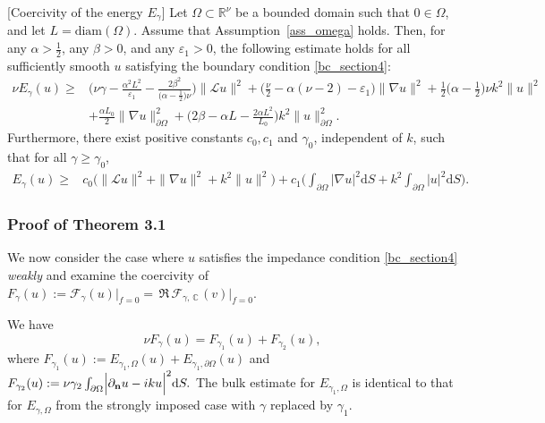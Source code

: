 \documentclass[twoside,11pt]{article}
\def\dimx{\nu }
\def\d{{\mathrm d}}
\def\C{{\mathbb C}}
\def\L{{\mathscr{L}}}
\def\L{{\mathscr{L}}}
\begin{document}
{\begin{theorem}\label{Th_coerc_gamma}{[Coercivity of the energy $E_{\gamma}$]}
Let $\Omega \subset \mathbb{R}^{{\dimx}}$ be a bounded domain such that $0 \in \Omega$, and let $L=\mathrm{diam}(\Omega)$. Assume that Assumption~\ref{ass_omega} holds. Then, for any $\alpha>\tfrac12$, any $\beta>0$, and any $\varepsilon_1>0$, the following estimate holds for all sufficiently smooth $u$ satisfying the boundary condition \eqref{bc_section4}:
\begin{equation}
\label{coerc_1}
\begin{split}
{\dimx} E_{\gamma}(u) 
 \ge  & 
\Bigg({\dimx} \gamma  -  \frac{\alpha^2 L^2}{\varepsilon_1}  -  \frac{2 \beta^2}{{\big(\alpha-\tfrac12\big) \dimx}} \Bigg)  \|\L u\|^2
 +  \Big(\tfrac{{\dimx}}{2} - \alpha({\dimx}-2) - \varepsilon_1\Big) \|\nabla u\|^2
 +  \tfrac12 \big(\alpha-\tfrac12\big) {\dimx} k^2 \|u\|^2
\\
& +  \frac{\alpha L_0}{2} \|\nabla u\|_{\partial\Omega}^2
 +  \Big(2\beta - \alpha L - \frac{2\alpha L^2}{L_0}\Big) k^2 \|u\|_{\partial\Omega}^2.
\end{split}
\end{equation}
Furthermore, there exist positive constants $c_0,c_1$ and $\gamma_0$, {independent of $k$}, such that for all $\gamma\ge \gamma_0$,
\begin{equation}
\label{coerc_c}
\begin{split}
E_{\gamma}(u) 
 \ge  & 
c_0 \Big( \|\L u\|^2 + \|\nabla u\|^2 + k^2 \|u\|^2 \Big)
 + 
c_1 \Big( \int_{\partial \Omega} |\nabla u|^2 \d S  +  k^2 \int_{\partial \Omega} |u|^2 \d S \Big).
\end{split}
\end{equation}
\end{theorem}

\subsubsection*{Proof of Theorem 3.1}

{We now consider the case where $u$ satisfies the impedance condition \eqref{bc_section4} \emph{weakly}} and examine the coercivity of $F_\gamma(u):=\mathcal{F}_\gamma(u)\big|_{f=0}= \, \Re \, \mathcal{F}_{\gamma,\,  \C \, } (v) \big|_{f=0}$.

We have
\begin{equation}\label{dimxFgamma}
      \dimx  F_\gamma(u)  =  F_{\gamma_1}(u)  +  F_{\gamma_2}(u),
\end{equation}
where $ F_{\gamma_1}(u) :=
E_{\gamma_1,\Omega}(u)+E_{\gamma_1,\partial\Omega}(u)$ and
$F_{\gamma_2}(u) := \dimx
\gamma_2\int_{\partial\Omega}\Bigl|\partial_{\mathbf n}u-ik u\Bigr|^2
\d S.$ {The bulk estimate for $E_{\gamma_1,\Omega}$ is identical to
  that for $E_{\gamma,\Omega}$ from the strongly imposed case with
  $\gamma$ replaced by $\gamma_1$.}
 
}
\end{document}
